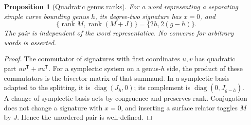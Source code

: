 \documentclass[11pt,letterpaper]{article}
\newtheorem{proposition}[proposition]{Proposition}
\theoremstyle{definition}
\theoremstyle{remark}
\newcommand{\rank}{\operatorname{rank}}
\begin{document}
\begin{proposition}[Quadratic genus ranks]\label{prop:genusrank}
For a word representing a separating simple curve bounding genus $h$, its degree-two signature has $x=0$, and
\[
 \{\rank M,\rank(M+J)\}=\{2h,2(g-h)\}.
\]
The pair is independent of the word representative. No converse for arbitrary words is asserted.
\end{proposition}
\begin{proof}
The commutator of signatures with first coordinates $u,v$ has quadratic part $uv^{\mathsf T}+vu^{\mathsf T}$. For a symplectic system on a genus-$h$ side, the product of these commutators is the bivector matrix of that summand. In a symplectic basis adapted to the splitting, it is $\operatorname{diag}(J_h,0)$; its complement is $\operatorname{diag}(0,J_{g-h})$. A change of symplectic basis acts by congruence and preserves rank. Conjugation does not change a signature with $x=0$, and inserting a surface relator toggles $M$ by $J$. Hence the unordered pair is well-defined.
\end{proof}
\end{document}
